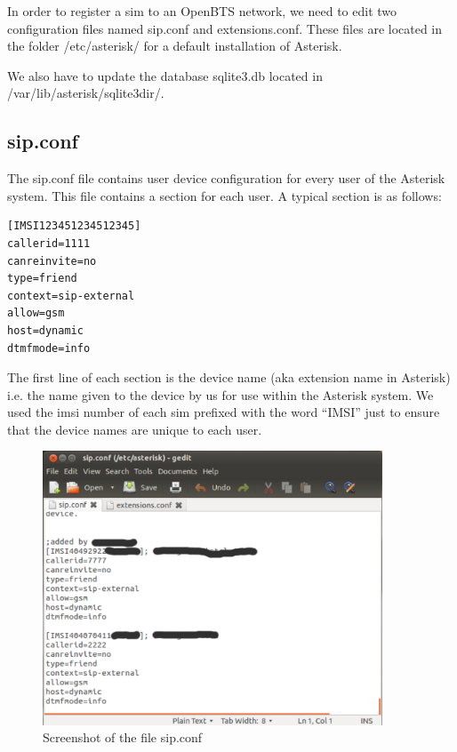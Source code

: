 In order to register a \gls{sim} to an OpenBTS network, we need to edit two 
configuration files named \textsf{sip.conf} and \textsf{extensions.conf}. These
files are located in the folder \textsf{/etc/asterisk/} for a default 
installation of Asterisk.

We also have to update the database \textsf{sqlite3.db} located in
\textsf{/var/lib/asterisk/sqlite3dir/}.

\subsection{sip.conf}

The \textsf{sip.conf} file contains user device configuration for every user of 
the Asterisk system. This file contains a section for each user. A typical 
section is as follows:
\begin{verbatim}
[IMSI123451234512345]
callerid=1111
canreinvite=no
type=friend
context=sip-external
allow=gsm
host=dynamic
dtmfmode=info    
\end{verbatim}

The first line of each section is the device name (aka extension name in
Asterisk) i.e. the name given to the device by us for use within the Asterisk
system. We used the \gls{imsi} number of each \gls{sim} prefixed with 
the word \textsf{``IMSI''}
just to ensure that the device names are unique to each user.

\begin{figure}
  \centering
    \includegraphics[width=0.9\textwidth]{../images/sip_conf}
  \caption[Screenshot - sip.conf]{Screenshot of the file \textsf{sip.conf}}
  \label{sip_conf}
\end{figure}


